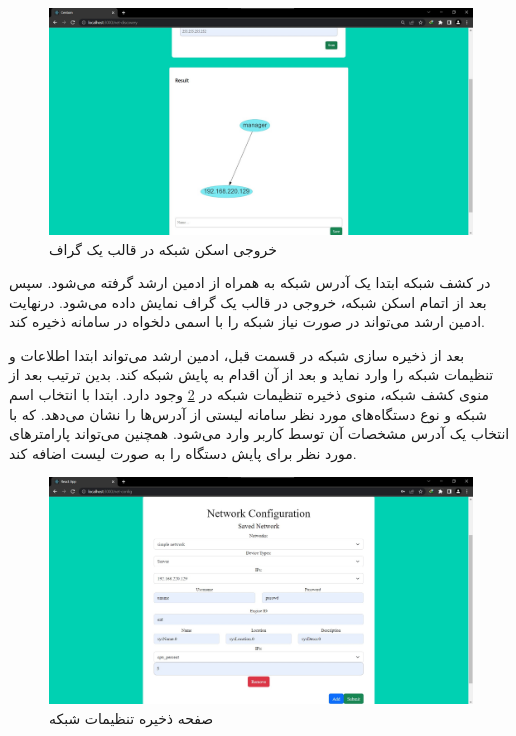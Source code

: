 \begin{figure}[!h]
    \centering\includegraphics[scale=.38]{./net-dis-after}
    \caption{خروجی اسکن شبکه در قالب یک گراف}\label{fig.16}
\end{figure}


در کشف شبکه ابتدا یک آدرس شبکه به همراه  از ادمین ارشد گرفته می‌شود. سپس بعد از اتمام اسکن شبکه، خروجی در قالب یک گراف نمایش داده می‌شود. درنهایت ادمین ارشد می‌تواند در صورت نیاز شبکه را با اسمی دلخواه در سامانه ذخیره کند.


بعد از ذخیره‌ سازی شبکه در قسمت قبل، ادمین ارشد می‌تواند ابتدا اطلاعات و تنظیمات شبکه را وارد نماید و بعد از آن اقدام به پایش شبکه کند. بدین ترتیب بعد از منوی کشف شبکه، منوی ذخیره تنظیمات شبکه در \cref{fig.17} وجود دارد. ابتدا با انتخاب اسم شبکه و نوع دستگاه‌های مورد نظر سامانه لیستی از آدرس‌ها را نشان می‌دهد. که با انتخاب یک آدرس مشخصات آن توسط کاربر وارد می‌شود. همچنین می‌تواند پارامترهای مورد نظر برای پایش دستگاه را به صورت لیست اضافه کند.



\begin{figure}[!h]
    \centering\includegraphics[scale=.38]{./net-config}
    \caption{صفحه ذخیره تنظیمات شبکه}\label{fig.17}
\end{figure}





